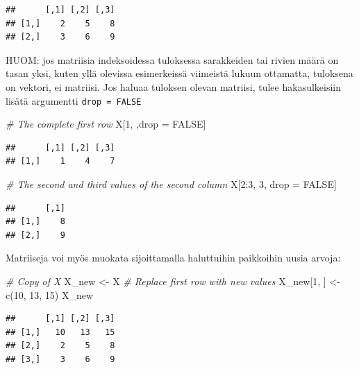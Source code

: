 \documentclass[
]{book}
\newenvironment{Shaded}{\begin{snugshade}}{\end{snugshade}}
\newcommand{\CommentTok}[1]{\textcolor[rgb]{0.56,0.35,0.01}{\textit{#1}}}
\newcommand{\ConstantTok}[1]{\textcolor[rgb]{0.00,0.00,0.00}{#1}}
\newcommand{\DecValTok}[1]{\textcolor[rgb]{0.00,0.00,0.81}{#1}}
\newcommand{\FunctionTok}[1]{\textcolor[rgb]{0.00,0.00,0.00}{#1}}
\newcommand{\NormalTok}[1]{#1}
\newcommand{\OtherTok}[1]{\textcolor[rgb]{0.56,0.35,0.01}{#1}}
\newcommand{\SpecialCharTok}[1]{\textcolor[rgb]{0.00,0.00,0.00}{#1}}
\begin{document}
\begin{verbatim}
##      [,1] [,2] [,3]
## [1,]    2    5    8
## [2,]    3    6    9
\end{verbatim}

HUOM: jos matriisia indeksoidessa tuloksessa sarakkeiden tai rivien määrä on tasan yksi, kuten yllä olevissa esimerkeissä viimeistä lukuun ottamatta, tuloksena on vektori, ei matriisi. Jos haluaa tuloksen olevan matriisi, tulee hakasulkeisiin lisätä argumentti \texttt{drop\ =\ FALSE}

\begin{Shaded}
\begin{Highlighting}[]
\CommentTok{\# The complete first row}
\NormalTok{X[}\DecValTok{1}\NormalTok{, ,drop }\OtherTok{=} \ConstantTok{FALSE}\NormalTok{]}
\end{Highlighting}
\end{Shaded}

\begin{verbatim}
##      [,1] [,2] [,3]
## [1,]    1    4    7
\end{verbatim}

\begin{Shaded}
\begin{Highlighting}[]
\CommentTok{\# The second and third values of the second column}
\NormalTok{X[}\DecValTok{2}\SpecialCharTok{:}\DecValTok{3}\NormalTok{, }\DecValTok{3}\NormalTok{, drop }\OtherTok{=} \ConstantTok{FALSE}\NormalTok{]}
\end{Highlighting}
\end{Shaded}

\begin{verbatim}
##      [,1]
## [1,]    8
## [2,]    9
\end{verbatim}

Matriiseja voi myös muokata sijoittamalla haluttuihin paikkoihin uusia arvoja:

\begin{Shaded}
\begin{Highlighting}[]
\CommentTok{\# Copy of X}
\NormalTok{X\_new }\OtherTok{\textless{}{-}}\NormalTok{ X}
\CommentTok{\# Replace first row with new values}
\NormalTok{X\_new[}\DecValTok{1}\NormalTok{, ] }\OtherTok{\textless{}{-}} \FunctionTok{c}\NormalTok{(}\DecValTok{10}\NormalTok{, }\DecValTok{13}\NormalTok{, }\DecValTok{15}\NormalTok{)}
\NormalTok{X\_new}
\end{Highlighting}
\end{Shaded}

\begin{verbatim}
##      [,1] [,2] [,3]
## [1,]   10   13   15
## [2,]    2    5    8
## [3,]    3    6    9
\end{verbatim}
\end{document}
